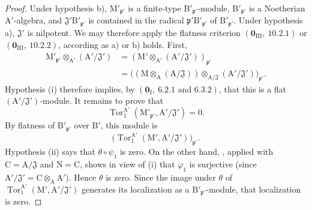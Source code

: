 \begin{proof}
Under hypothesis b), $\mathrm{M}'_{\mathfrak{p}'}$ is a finite-type
$\mathrm{B}'_{\mathfrak{p}'}$-module,
$\mathrm{B}'_{\mathfrak{p}'}$ is a Noetherian
$\mathrm{A}'$-algebra, and
$\mathfrak{J}'\mathrm{B}'_{\mathfrak{p}'}$ is contained in the radical
$\mathfrak{p}'\mathrm{B}'_{\mathfrak{p}'}$ of
$\mathrm{B}'_{\mathfrak{p}'}$. Under hypothesis a),
$\mathfrak{J}'$ is nilpotent. We may therefore apply the flatness
criterion $(\mathbf{0}_{\mathrm{III}},~10.2.1)$ or
$(\mathbf{0}_{\mathrm{III}},~10.2.2)$, according as a) or b) holds.
First,
\[
\begin{split}
  \mathrm{M}'_{\mathfrak{p}'}\otimes_{\mathrm{A}'}
    (\mathrm{A}'/\mathfrak{J}')
  &=(\mathrm{M}'\otimes_{\mathrm{A}'}
    (\mathrm{A}'/\mathfrak{J}'))_{\mathfrak{p}'}\\
  &=\bigl((\mathrm{M}\otimes_\mathrm{A}
    (\mathrm{A}/\mathfrak{J}))
    \otimes_{\mathrm{A}/\mathfrak{J}}
    (\mathrm{A}'/\mathfrak{J}')\bigr)_{\mathfrak{p}'}.
\end{split}
\]
Hypothesis (i) therefore implies, by
$(\mathbf{0}_\mathrm{I},~6.2.1\text{ and }6.3.2)$, that this is a flat
$(\mathrm{A}'/\mathfrak{J}')$-module. It remains to prove that
\[
  \operatorname{Tor}_1^{\mathrm{A}'}
  (\mathrm{M}'_{\mathfrak{p}'},\mathrm{A}'/\mathfrak{J}')=0.
\]
By flatness of $\mathrm{B}'_{\mathfrak{p}'}$ over $\mathrm{B}'$, this
module is
\[
  \bigl(\operatorname{Tor}_1^{\mathrm{A}'}
  (\mathrm{M}',\mathrm{A}'/\mathfrak{J}')\bigr)_{\mathfrak{p}'}.
\]
Hypothesis (ii) says that $\theta\circ\psi_1$ is zero. On the other
hand, , applied with
$\mathrm{C}=\mathrm{A}/\mathfrak{J}$ and $\mathrm{N}=\mathrm{C}$,
shows in view of (i) that $\varphi_1$ is surjective
(since $\mathrm{A}'/\mathfrak{J}'=\mathrm{C}\otimes_\mathrm{A}
\mathrm{A}'$). Hence $\theta$ is zero. Since the image under $\theta$
of $\operatorname{Tor}_1^{\mathrm{A}'}
(\mathrm{M}',\mathrm{A}'/\mathfrak{J}')$ generates its localization as
a $\mathrm{B}'_{\mathfrak{p}'}$-module, that localization is zero.
\end{proof}

